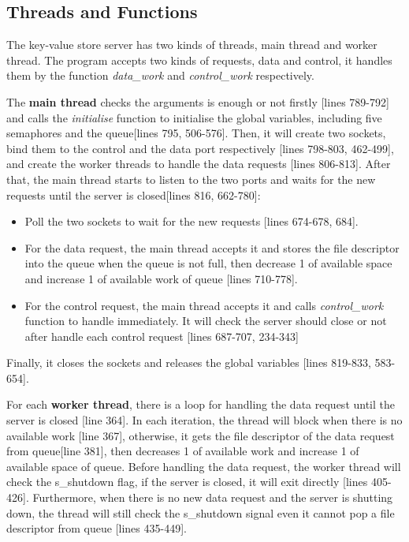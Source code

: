 \documentclass[10pt, a4paper]{article}
\begin{document}
\subsection{Threads and Functions}
    
The key-value store server has two kinds of threads, main thread and worker thread. The program accepts two kinds of requests, data and control, it handles them by the function \textit{data\_work} and \textit{control\_work} respectively. 
    
The \textbf{main thread} checks the arguments is enough or not firstly [lines 789-792] and calls the \textit{initialise} function to initialise the global variables, including five semaphores and the queue[lines 795, 506-576]. Then, it will create two sockets, bind them to the control and the data port respectively [lines 798-803, 462-499], and create the worker threads to handle the data requests [lines 806-813]. After that, the main thread starts to listen to the two ports and waits for the new requests until the server is closed[lines 816, 662-780]:
    
\begin{itemize}
    \item Poll the two sockets to wait for the new requests [lines 674-678, 684].
    \item For the data request, the main thread accepts it and stores the file descriptor into the queue when the queue is not full, then decrease 1 of available space and increase 1 of available work of queue [lines 710-778].
    \item For the control request, the main thread accepts it and calls \textit{control\_work} function to handle immediately. It will check the server should close or not after handle each control request [lines 687-707, 234-343]
\end{itemize}
    
Finally, it closes the sockets and releases the global variables [lines 819-833, 583-654].
    
For each \textbf{worker thread}, there is a loop for handling the data request until the server is closed [line 364]. In each iteration, the thread will block when there is no available work [line 367], otherwise, it gets the file descriptor of the data request from queue[line 381], then decreases 1 of available work and increase 1 of available space of queue. Before handling the data request, the worker thread will check the s\_shutdown flag, if the server is closed, it will exit directly [lines 405-426]. Furthermore, when there is no new data request and the server is shutting down, the thread will still check the s\_shutdown signal even it cannot pop a file descriptor from queue [lines 435-449].
    
\end{document}
